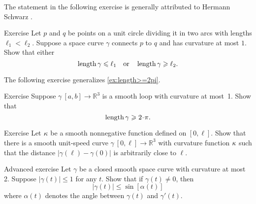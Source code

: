 The statement in the following exercise is generally attributed to Hermann Schwarz \cite{shur}.

\begin{thm}{Exercise}\label{ex:schwartz}
Let $p$ and $q$ be points on a unit circle dividing it in two arcs with lengths $\ell_1<\ell_2$.
Suppose a space curve $\gamma$ connects $p$ to $q$ and has curvature at most $1$.
Show that either
\[\mathop{\rm length}\nolimits \gamma\leqslant \ell_1
\quad\text{or}\quad
\mathop{\rm length}\nolimits \gamma\geqslant \ell_2.
\]
\end{thm}

The following exercise generalizes \ref{ex:length>=2pi}.

\begin{thm}{Exercise}\label{ex:loop}
Suppose $\gamma\:[a,b]\to \mathbb{R}^3$ is a smooth loop with curvature at most~1.
Show that 
\[\length\gamma\ge2\cdot\pi.\]

\end{thm}

\begin{thm}{Exercise}\label{ex:bow-upper}
Let $\kappa$ be a smooth nonnegative function defined on $[0,\ell]$.
Show that there is a smooth unit-speed curve $\gamma\:[0,\ell]\to\mathbb{R}^3$ with curvature function $\kappa$ such that the distance $|\gamma(\ell)-\gamma(0)|$ is arbitrarily close to $\ell$.
\end{thm}

\begin{thm}{Advanced exercise}\label{ex:gromov-twist}
Let $\gamma$ be a closed smooth space curve with curvature at most 2.
Suppose $|\gamma(t)|\le 1$ for any $t$.
Show that if $\gamma(t)\ne 0$, then 
\[|\gamma(t)| \le \sin [\alpha(t)]\]
where $\alpha(t)$ denotes the angle between  $\gamma(t)$ and $\gamma'(t)$.
\end{thm}

